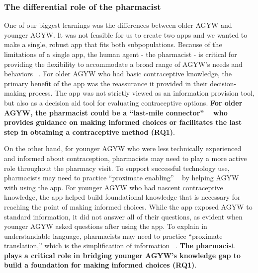 \subsubsection{The differential role of the pharmacist}
One of our biggest learnings was the differences between older AGYW and younger AGYW. It was not feasible for us to create two apps and we wanted to make a single, robust app that fits both subpopulations. Because of the limitations of a single app, the human agent - the pharmacist - is critical for providing the flexibility to accommodate a broad range of AGYW’s needs and behaviors ~\cite{10.1145/2369220.2369258, 10.1145/3173574.3174213}. For older AGYW who had basic contraceptive knowledge, the primary benefit of the app was the reassurance it provided in their decision-making process. The app was not strictly viewed as an information provision tool, but also as a decision aid tool for evaluating contraceptive options.  \textbf{For older AGYW, the pharmacist could be a ``last-mile connector” ~\cite{10.1145/2369220.2369258} who provides guidance on making informed choices or facilitates the last step in obtaining a contraceptive method (RQ1)}. 
 
On the other hand, for younger AGYW who were less technically experienced and  informed about contraception, pharmacists may need to play a more active role throughout the pharmacy visit. To support successful technology use, pharmacists may need to practice ``proximate enabling” ~\cite{10.1145/1753326.1753718} by helping AGYW with using the app. For younger AGYW who had nascent contraceptive knowledge, the app helped build foundational knowledge that is necessary for reaching the point of making informed choices. While the app exposed AGYW to standard information, it did not answer all of their questions, as  evident  when younger AGYW asked questions  after using the app.  To explain  in understandable language, pharmacists may need to practice ``proximate translation,” which is the simplification of information ~\cite{10.1145/1753326.1753718}. \textbf{The pharmacist plays a critical role in bridging younger AGYW’s knowledge gap to build a foundation for making informed choices (RQ1)}. 

